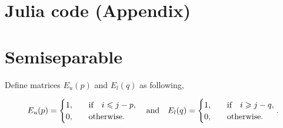 \documentclass[11pt]{article}
\begin{document}
\newpage



\section{Julia code (Appendix)}










\section{Semiseparable}

Define matrices $E_{u}(p)$ and $E_{l}(q)$ as following,

\begin{align}
    E_{u}(p) = \begin{cases}
        1\qc &  \qif* i \leqslant j - p, \\ 
        0\qc &  \text{otherwise}.
    \end{cases}
    \qand
    E_{l}(q) = \begin{cases}
        1\qc &  \qif* i \geqslant j - q, \\ 
        0\qc &  \text{otherwise}.
    \end{cases}.
\end{align}
\end{document}
